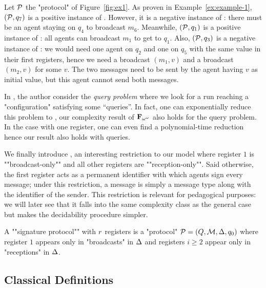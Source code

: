 \begin{example}\label{example-2}
	Let $\mathcal{P}$ the "protocol" of Figure~\ref{fig:ex1}. As proven in Example~\ref{ex:example-1}, $(\mathcal{P},q_7)$ is a positive instance of \COVER. However, it is a negative instance of \TARGET: there must be an agent staying on $q_4$ to broadcast $m_6$. Meanwhile, $(\mathcal{P},q_1)$ is a positive instance of \TARGET: all agents can broadcast $m_1$ to get to $q_1$. Also, $(\mathcal{P}, q_3)$ is a negative instance of \COVER: we would need one agent on $q_2$ and one on $q_5$ with the same value in their first registers, hence we need a broadcast $(m_1,v)$ and a broadcast $(m_2,v)$ for some $v$. The two messages need to be sent by the agent having $v$ as initial value, but this agent cannot send both messages.
\end{example}

\begin{remark}
	In \cite{DelzannoST13}, the author consider the \AP \emph{query problem} where we look for a run reaching a "configuration" satisfying some ``queries''.	
	In fact, one can exponentially reduce this problem to \COVER, our complexity result of $\mathbf{F}_{\omega^\omega}$ also holds for the query problem. In the case with one register, one can even find a polynomial-time reduction hence our \NP result also holds with queries. 
\end{remark}

\AP We finally introduce , an interesting restriction to our model where register $1$ is ""broadcast-only"" and all other registers are ""reception-only"". Said otherwise, the first register acts as a permanent identifier with which agents sign every message; under this restriction, a message is simply a message type along with the identifier of the sender. This restriction is relevant for pedagogical purposes: we will later see that it falls into the same complexity class as the general case but makes the decidability procedure simpler. 

\begin{definition}
A ""signature protocol"" with $r$ registers is a "protocol" $\mathcal{P} = (Q, \mathcal{M}, \Delta, q_0)$ where register $1$ appears only in "broadcasts" in $\Delta$ and registers $i \geq 2$ appear only in "receptions" in $\Delta$. 
\end{definition}

\subsection{Classical Definitions}


